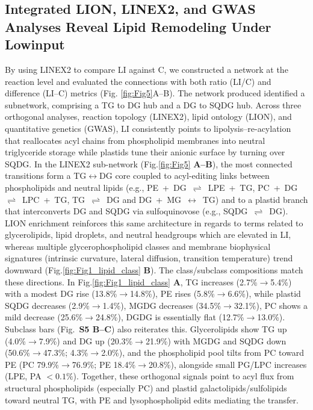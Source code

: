 \documentclass[10pt,letterpaper]{article}
\begin{document}
\begin{itemize}
\subsection*{Integrated LION, LINEX2, and GWAS Analyses Reveal Lipid Remodeling Under Lowinput}
By using LINEX2 to compare LI against C, we constructed a network at the reaction level and evaluated the connections with both ratio (LI/C) and difference (LI–C) metrics (Fig. \ref{fig:Fig5}A–B). The network produced identified a subnetwork, comprising a TG to DG hub and a DG to SQDG hub. Across three orthogonal analyses, reaction topology (LINEX2), lipid ontology (LION), and quantitative genetics (GWAS), LI consistently points to lipolysis–re-acylation that reallocates acyl chains from phospholipid membranes into neutral triglyceride storage while plastids tune their anionic surface by turning over SQDG. In the LINEX2 sub-network (Fig.\ref{fig:Fig5} \textbf{A–B}), the most connected transitions form a TG$\leftrightarrow$DG core coupled to acyl-editing links between phospholipids and neutral lipids (e.g., \mbox{PE + DG $\rightleftharpoons$ LPE + TG}, \mbox{PC + DG $\rightleftharpoons$ LPC + TG}, \mbox{TG $\rightleftharpoons$ DG} and \mbox{DG + MG $\leftrightarrow$ TG}) and to a plastid branch that interconverts DG and SQDG via sulfoquinovose (e.g., \mbox{SQDG  $\rightleftharpoons$ DG}). LION enrichment reinforces this same architecture in regards to terms related to glycerolipids, lipid droplets, and neutral headgroups which are elevated in LI, whereas multiple glycerophospholipid classes and membrane biophysical signatures (intrinsic curvature, lateral diffusion, transition temperature) trend downward (Fig.\ref{fig:Fig1_lipid_class} \textbf{B}). The class/subclass compositions match these directions. In Fig.\ref{fig:Fig1_lipid_class} \textbf{A}, TG increases (2.7\%$\rightarrow$5.4\%) with a modest DG rise (13.8\%$\rightarrow$14.8\%), PE rises (5.8\%$\rightarrow$6.6\%), while plastid SQDG decreases (2.9\%$\rightarrow$1.4\%), MGDG decreases (34.5\%$\rightarrow$32.1\%), PC shows a mild decrease (25.6\%$\rightarrow$24.8\%), DGDG is essentially flat (12.7\%$\rightarrow$13.0\%). Subclass bars (Fig.\ \textbf{S5 B–C}) also reiterates this. Glycerolipids show TG up (4.0\%$\rightarrow$7.9\%) and DG up (20.3\%$\rightarrow$21.9\%) with MGDG and SQDG down (50.6\%$\rightarrow$47.3\%; 4.3\%$\rightarrow$2.0\%), and the phospholipid pool tilts from PC toward PE (PC 79.9\%$\rightarrow$76.9\%; PE 18.4\%$\rightarrow$20.8\%), alongside small PG/LPC increases (LPE, PA $<0.1\%$). Together, these orthogonal signals point to acyl flux from structural phospholipids (especially PC) and plastid galactolipids/sulfolipids toward neutral TG, with PE and lysophospholipid edits mediating the transfer.


\end{itemize}
\end{document}
